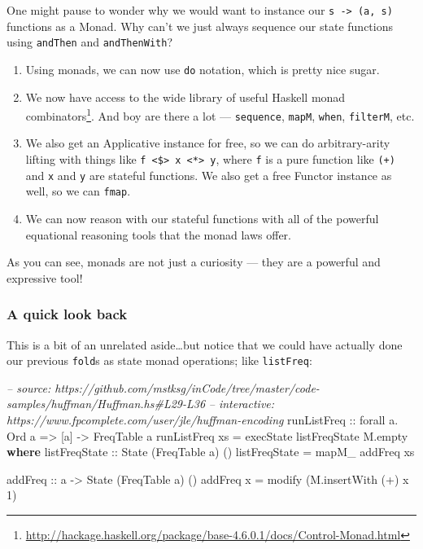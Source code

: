 \documentclass[]{article}
\newenvironment{Shaded}{}{}
\newcommand{\KeywordTok}[1]{\textcolor[rgb]{0.00,0.44,0.13}{\textbf{#1}}}
\newcommand{\DataTypeTok}[1]{\textcolor[rgb]{0.56,0.13,0.00}{#1}}
\newcommand{\DecValTok}[1]{\textcolor[rgb]{0.25,0.63,0.44}{#1}}
\newcommand{\CommentTok}[1]{\textcolor[rgb]{0.38,0.63,0.69}{\textit{#1}}}
\newcommand{\OtherTok}[1]{\textcolor[rgb]{0.00,0.44,0.13}{#1}}
\newcommand{\FunctionTok}[1]{\textcolor[rgb]{0.02,0.16,0.49}{#1}}
\newcommand{\NormalTok}[1]{#1}
\renewcommand{\href}[2]{#2\footnote{\url{#1}}}
\begin{document}
One might pause to wonder why we would want to instance our
\texttt{s\ -\textgreater{}\ (a,\ s)} functions as a Monad. Why can't we just
always sequence our state functions using \texttt{andThen} and
\texttt{andThenWith}?

\begin{enumerate}
\def\labelenumi{\arabic{enumi}.}
\item
  Using monads, we can now use \texttt{do} notation, which is pretty nice sugar.
\item
  We now have access to the wide library of useful Haskell
  \href{http://hackage.haskell.org/package/base-4.6.0.1/docs/Control-Monad.html}{monad
  combinators}. And boy are there a lot --- \texttt{sequence}, \texttt{mapM},
  \texttt{when}, \texttt{filterM}, etc.
\item
  We also get an Applicative instance for free, so we can do arbitrary-arity
  lifting with things like
  \texttt{f\ \textless{}\$\textgreater{}\ x\ \textless{}*\textgreater{}\ y},
  where \texttt{f} is a pure function like \texttt{(+)} and \texttt{x} and
  \texttt{y} are stateful functions. We also get a free Functor instance as
  well, so we can \texttt{fmap}.
\item
  We can now reason with our stateful functions with all of the powerful
  equational reasoning tools that the monad laws offer.
\end{enumerate}

As you can see, monads are not just a curiosity --- they are a powerful and
expressive tool!

\subsubsection{A quick look back}\label{a-quick-look-back}

This is a bit of an unrelated aside\ldots{}but notice that we could have
actually done our previous \texttt{fold}s as state monad operations; like
\texttt{listFreq}:

\begin{Shaded}
\begin{Highlighting}[]
\CommentTok{-- source: https://github.com/mstksg/inCode/tree/master/code-samples/huffman/Huffman.hs#L29-L36}
\CommentTok{-- interactive: https://www.fpcomplete.com/user/jle/huffman-encoding}
\OtherTok{runListFreq ::}\NormalTok{ forall a}\FunctionTok{.} \DataTypeTok{Ord}\NormalTok{ a }\OtherTok{=>}\NormalTok{ [a] }\OtherTok{->} \DataTypeTok{FreqTable}\NormalTok{ a}
\NormalTok{runListFreq xs }\FunctionTok{=}\NormalTok{ execState listFreqState M.empty}
  \KeywordTok{where}
\OtherTok{    listFreqState ::} \DataTypeTok{State}\NormalTok{ (}\DataTypeTok{FreqTable}\NormalTok{ a) ()}
\NormalTok{    listFreqState }\FunctionTok{=}\NormalTok{ mapM_ addFreq xs}

\OtherTok{    addFreq ::}\NormalTok{ a }\OtherTok{->} \DataTypeTok{State}\NormalTok{ (}\DataTypeTok{FreqTable}\NormalTok{ a) ()}
\NormalTok{    addFreq x }\FunctionTok{=}\NormalTok{ modify (M.insertWith (}\FunctionTok{+}\NormalTok{) x }\DecValTok{1}\NormalTok{)}
\end{Highlighting}
\end{Shaded}
\end{document}
